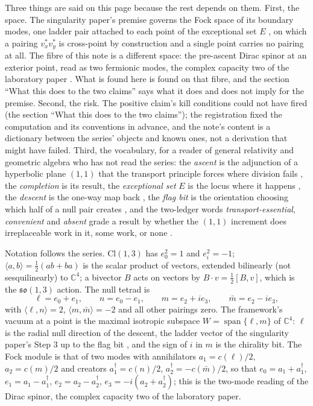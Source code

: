 \documentclass[11pt]{article}
\theoremstyle{definition}
\theoremstyle{plain}
\providecommand{\C}{}\renewcommand{\C}{\mathbb{C}}
\providecommand{\Cl}{}\renewcommand{\Cl}{\mathrm{Cl}}
\providecommand{\mb}{}\renewcommand{\mb}{\bar m}
\providecommand{\so}{}\renewcommand{\so}{\mathfrak{so}}
\providecommand{\ip}{}\renewcommand{\ip}[2]{\langle #1, #2\rangle}
\begin{document}
Three things are said on this page because the rest depends on them. First, the space. The singularity paper's premise governs the Fock space of its boundary modes, one ladder pair attached to each point of the exceptional set $E$ \cite[Prem.~7.30, Fact~5.9]{ButlerT5}, on which a pairing $v^{*}_{x}v^{*}_{y}$ is cross-point by construction and a single point carries no pairing at all. The fibre of this note is a different space: the pre-ascent Dirac spinor at an exterior point, read as two fermionic modes, the complex capacity two of the laboratory paper \cite[Prop.~3.2(1)]{ButlerT16}. What is found here is found on that fibre, and the section ``What this does to the two claims'' says what it does and does not imply for the premise. Second, the risk. The positive claim's kill conditions could not have fired (the section ``What this does to the two claims''); the registration fixed the computation and its conventions in advance, and the note's content is a dictionary between the series' objects and known ones, not a derivation that might have failed. Third, the vocabulary, for a reader of general relativity and geometric algebra who has not read the series: the \emph{ascent} is the adjunction of a hyperbolic plane $(1,1)$ that the transport principle forces where division fails \cite[Thm.~4.13]{ButlerT1}, the \emph{completion} is its result, the \emph{exceptional set} $E$ is the locus where it happens \cite[Thm.~8.12]{ButlerT4}, the \emph{descent} is the one-way map back \cite[Thm.~7.3]{ButlerT5}, the \emph{flag bit} is the orientation choosing which half of a null pair creates \cite[Def.~2.10]{ButlerT14}, and the two-ledger words \emph{transport-essential}, \emph{convenient} and \emph{absent} grade a result by whether the $(1,1)$ increment does irreplaceable work in it, some work, or none \cite{ButlerT17}.

Notation follows the series. $\Cl(1,3)$ has $e_0^2 = 1$ and $e_i^2 = -1$; $\ip{a}{b} = \tfrac12(ab + ba)$ is the scalar product of vectors, extended bilinearly (not sesquilinearly) to $\C^4$; a bivector $B$ acts on vectors by $B\cdot v = \tfrac12[B, v]$, which is the $\so(1,3)$ action. The null tetrad is
\[
\ell = e_0 + e_1, \qquad n = e_0 - e_1, \qquad m = e_2 + i e_3, \qquad \mb = e_2 - i e_3,
\]
with $\ip{\ell}{n} = 2$, $\ip{m}{\mb} = -2$ and all other pairings zero. The framework's vacuum at a point is the maximal isotropic subspace $W = \operatorname{span}\{\ell, m\}$ of $\C^4$: $\ell$ is the radial null direction of the descent, the ladder vector of the singularity paper's Step 3 up to the flag bit \cite[Sec.~4, Lem.~4.1]{ButlerT5}, and the sign of $i$ in $m$ is the chirality bit. The Fock module is that of two modes with annihilators $a_1 = c(\ell)/2$, $a_2 = c(m)/2$ and creators $a_1^{\dagger} = c(n)/2$, $a_2^{\dagger} = -c(\mb)/2$, so that $e_0 = a_1 + a_1^{\dagger}$, $e_1 = a_1 - a_1^{\dagger}$, $e_2 = a_2 - a_2^{\dagger}$, $e_3 = -i(a_2 + a_2^{\dagger})$; this is the two-mode reading of the Dirac spinor, the complex capacity two of the laboratory paper.
\end{document}
